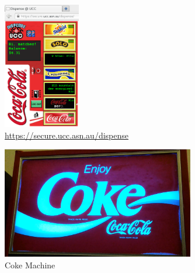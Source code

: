 \begin{mdframed}

\begin{figure}[H]
	\centering
	\includegraphics[width=0.3\textwidth]{figures/webdispense.png}
	\caption{\url{https://secure.ucc.asn.au/dispense}} 
	\label{webdispense.png}
\end{figure}

\begin{figure}[H]
	\centering
	\includegraphics[width=0.75\textwidth]{figures/cokemachine.png}
	\caption{Coke Machine}
	\label{cokemachine.png}
\end{figure}

\end{mdframed}
